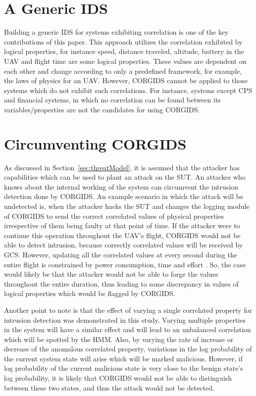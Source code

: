 \section{A Generic IDS}
Building a generic IDS for systems exhibiting correlation is one of the key contributions of this paper. This approach utilizes the correlation exhibited by logical properties, for instance speed, distance traveled, altitude, battery in the UAV and flight time are some logical properties. These values are dependent on each other and change according to only a predefined framework, for example, the laws of physics for an UAV. However, CORGIDS cannot be applied to those systems which do not exhibit such correlations. For instance, systems except CPS and financial systems, in which no correlation can be found between its variables/properties are not the candidates for using CORGIDS.

\section{Circumventing CORGIDS}
As discussed in Section~\ref{sec:threatModel}, it is assumed that the attacker has capabilities which can be used to plant an attack on the SUT. An attacker who knows about the internal working of the system can circumvent the intrusion detection done by CORGIDS. An example scenario in which the attack will be undetected is, when the attacker hacks the SUT and changes the logging module of CORGIDS to send the correct correlated values of physical properties irrespective of them being faulty at that point of time. If the attacker were to continue this operation throughout the UAV's flight, CORGIDS would not be able to detect intrusion, because correctly correlated values will be received by GCS. However, updating all the correlated values at every second during the entire flight is constrained by power consumption, time and effort \cite{krotofil2015process}. So, the case would likely be that the attacker would  not be able to forge the values throughout the entire duration, thus leading to some discrepancy in values of logical properties which would be flagged by CORGIDS. 

Another point to note is that the effect of varying a single correlated property for intrusion detection was demonstrated in this study. Varying multiple properties in the system will have a similar effect and will lead to an unbalanced correlation which will be spotted by the HMM. Also, by varying the rate of increase or decrease of the anomalous correlated property, variations in the log probability of the current system state will arise which will be marked malicious. However, if log probability of the current malicious state is very close to the benign state's log probability, it is likely that CORGIDS would not be able to distinguish between these two states, and thus the attack would not be detected.
\endinput
=====================================================================


